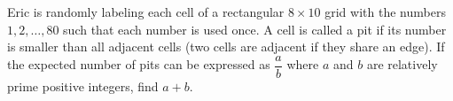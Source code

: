 Eric is randomly labeling each cell of a rectangular $8\times 10$ grid with the numbers $1,2,\dots,80$ such that each number is used once. A cell is called a pit if its number is smaller than all adjacent cells (two cells are adjacent if they share an edge). If the expected number of pits can be expressed as $\dfrac{a}{b}$ where $a$ and $b$ are relatively prime positive integers, find $a+b$.
